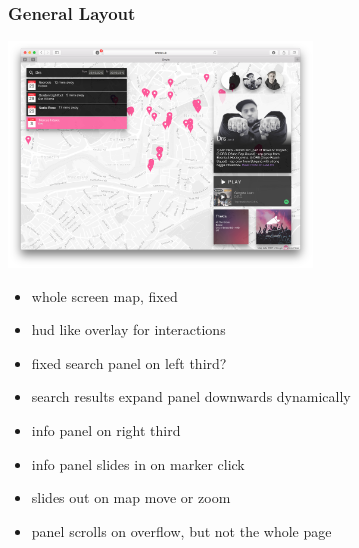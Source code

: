 \documentclass[10pt]{article}
\begin{document}
            \subsubsection{General Layout}
                \includegraphics[height=60mm]{example1.png}
                \begin{itemize}
                    \item whole screen map, fixed
                    \item hud like overlay for interactions

                    \item fixed search panel on left third?
                    \item search results expand panel downwards dynamically

                    \item info panel on right third
                    \item info panel slides in on marker click
                    \item slides out on map move or zoom
                    \item panel scrolls on overflow, but not the whole page
                \end{itemize}
\end{document}
